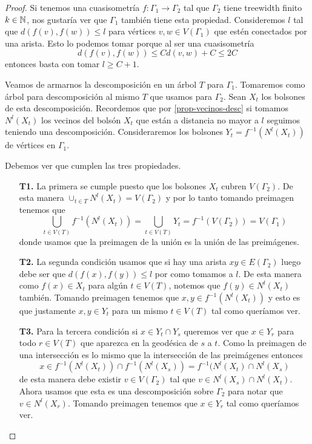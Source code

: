 \documentclass[tesis.tex]{subfiles}
\begin{document}
\begin{proof}
	Si tenemos una cuasisometría $f:\Gamma_1 \to \Gamma_2$ tal que $\Gamma_2$ tiene treewidth finito $k \in \mathbb{N}$, nos gustaría ver que $\Gamma_1$ también tiene esta propiedad.
	Consideremos $l$ tal que $d(f(v),f(w)) \le l$ para vértices $v,w \in V(\Gamma_1)$ que estén conectados por una arista.
	Esto lo podemos tomar porque al ser una cuasisometría 
	\[
	d(f(v),f(w)) \le C d(v,w) + C  \le 2C
	\]
	entonces basta con tomar $l \ge C+1$.
	
	Veamos de armarnos la descomposición en un árbol $T$ para $\Gamma_1$.	
	Tomaremos como árbol para descomposición al mismo $T$ que usamos para $\Gamma_2$.
	Sean $X_t$ los bolsones de esta descomposición. 
	Recordemos que por \ref{prop-vecinos-desc} si tomamos $N^l(X_t)$ los vecinos del bolsón $X_t$ que están a distancia no mayor a $l$ seguimos teniendo una descomposición.  
	Consideraremos los bolsones $Y_t = f^{-1}(N^l(X_t))$ de vértices en $\Gamma_1$. 
	
	Debemos ver que cumplen las tres propiedades.
	
	\begin{enumerate}
		\item[\textbf{T1.}] La primera se cumple puesto que los bolsones $X_t$ cubren $V(\Gamma_2)$. 
		De esta manera $\cup_{t \in T} N^l(X_t) = V(\Gamma_2)$ y por lo tanto tomando preimagen tenemos que
		\[
		\bigcup_{t \in V(T)} f^{-1} (N^l (X_t)) = \bigcup_{t \in V(T)} Y_t = f^{-1} (V(\Gamma_2)) = V(\Gamma_1)
		\] 
		donde usamos que la preimagen de la unión es la unión de las preimágenes.
		\item[\textbf{T2.}] La segunda condición usamos que si hay una arista $xy \in E(\Gamma_2)$ luego debe ser que $d(f(x),f(y)) \le l$ por como tomamos a $l$.
		De esta manera como $f(x) \in X_t$ para algún $t \in V(T)$, notemos que $f(y) \in N^l(X_t)$ también. 
		Tomando preimagen tenemos que $x,y \in f^{-1}(N^l(X_t))$ y esto es que justamente $x,y \in Y_t$ para un mismo $t \in V(T)$ tal como queríamos ver.		
		\item[\textbf{T3.}] Para la tercera condición si $x \in Y_t \cap Y_s$ queremos ver que $x \in Y_r$ para todo $r \in V(T)$ que aparezca en la geodésica de $s$ a $t$.
		Como la preimagen de una intersección es lo mismo que la intersección de las preimágenes entonces 
		\[
		x \in f^{-1}(N^l(X_t)) \cap f^{-1}(N^l(X_s)) = f^{-1}(N^l(X_t) \cap N^l (X_s)
		\]
		de esta manera debe existir $v \in V(\Gamma_2)$ tal que $v \in N^l(X_s) \cap N^l(X_t)$.
		Ahora usamos que esta es una descomposición sobre $\Gamma_2$ para notar que $v \in N^l(X_r)$.
		Tomando preimagen tenemos que $x \in Y_r$ tal como queríamos ver.
	\end{enumerate}
	

\end{proof}
\end{document}

